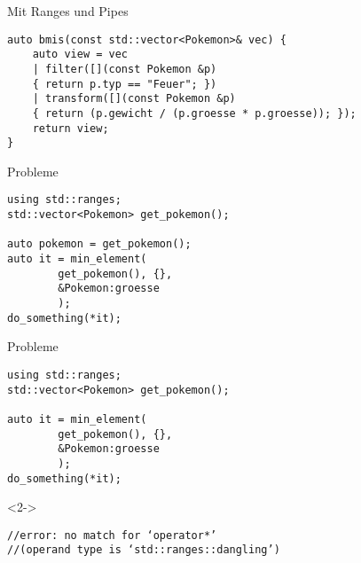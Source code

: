 \begin{frame}[fragile]{Mit Ranges und Pipes}
    \begin{verbatim}
auto bmis(const std::vector<Pokemon>& vec) {
    auto view = vec
    | filter([](const Pokemon &p)
    { return p.typ == "Feuer"; })
    | transform([](const Pokemon &p)
    { return (p.gewicht / (p.groesse * p.groesse)); });
    return view;
}
\end{verbatim}
\end{frame}

\begin{frame}[fragile]{Probleme}
    \begin{overlayarea}{\linewidth}{3cm}
    \begin{verbatim}
using std::ranges;
std::vector<Pokemon> get_pokemon();

auto pokemon = get_pokemon();
auto it = min_element(
        get_pokemon(), {},
        &Pokemon:groesse
        );
do_something(*it);
    \end{verbatim}
\end{overlayarea}
\end{frame}

\begin{frame}[fragile]{Probleme}
    \begin{overlayarea}{\linewidth}{3cm}
    \begin{verbatim}
using std::ranges;
std::vector<Pokemon> get_pokemon();

auto it = min_element(
        get_pokemon(), {},
        &Pokemon:groesse
        );
do_something(*it);
    \end{verbatim}
    \begin{onlyenv}<2->
        \begin{verbatim}
//error: no match for ‘operator*’
//(operand type is ‘std::ranges::dangling’)
        \end{verbatim}
    \end{onlyenv}
\end{overlayarea}
\end{frame}



